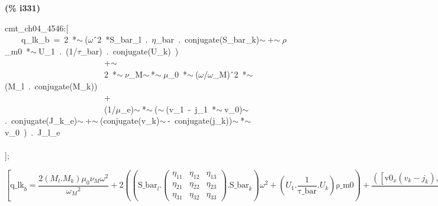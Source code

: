 \documentclass[fleqn]{article}
\begin{document}
\noindent
\begin{minipage}[t]{4.000000em}\color{red}\bfseries
(\% i331)	
\end{minipage}
\begin{minipage}[t]{\textwidth}\color{blue}
cmt\_ch04\_4546:[\\
\ \ \ \ q\_lk\_b\ =\ 2\ *\ensuremath{\sim\ }(\ensuremath{\omega}\^\ 2\ *S\_bar\_l\ .\ \ensuremath{\eta}\_bar\ .\ conjugate(S\_bar\_k)\ensuremath{\sim\ }+\ensuremath{\sim\ }\ensuremath{\rho}\_m0\ *\ensuremath{\sim\ }U\_1\ .\ (1/\ensuremath{\tau}\_bar)\ .\ conjugate(U\_k)\ )\\
\ \ \ \ \ \ \ \ \ \ \ \ \ \ \ \ \ \ \ \ \ \ \ \ +\ensuremath{\sim\ }\\
\ \ \ \ \ \ \ \ \ \ \ \ \ \ \ \ \ \ \ \ \ \ \ \ 2\ *\ensuremath{\sim\ }\ensuremath{\nu}\_M\ensuremath{\sim\ }*\ensuremath{\sim\ }\ensuremath{\mu}\_0\ *\ensuremath{\sim\ }(\ensuremath{\omega}/\ensuremath{\omega}\_M)\^\ 2\ *\ensuremath{\sim\ }(M\_l\ .\ conjugate(M\_k))\\
\ \ \ \ \ \ \ \ \ \ \ \ \ \ \ \ \ \ \ \ \ \ \ \ +\\
\ \ \ \ \ \ \ \ \ \ \ \ \ \ \ \ \ \ \ \ \ \ \ \ (1/\ensuremath{\mu}\_e)\ensuremath{\sim\ }*\ensuremath{\sim\ }(\ensuremath{\sim\ }(v\_1\ -\ j\_1\ *\ensuremath{\sim\ }v\_0)\ensuremath{\sim\ }.\ conjugate(J\_k\_e)\ensuremath{\sim\ }+\ensuremath{\sim\ }(conjugate(v\_k)\ensuremath{\sim\ }-\ conjugate(j\_k))\ensuremath{\sim\ }*\ensuremath{\sim\ }v\_0\ )\ .\ J\_l\_e\\
\ \ \ \ \\
];
\end{minipage}
\[\displaystyle \tag{\% o331} 
\operatorname{[}{{\ensuremath{\mathrm{q\_ lk}}}_b}=\frac{2 \left( {M_l}\ensuremath{\mathrm{ . }}{M_k}\right)  {{\mu }_0} {{\nu }_M} {{\omega }^{2}}}{{{{{\omega }_M}}^{2}}}+2 \left( \left( {{\ensuremath{\mathrm{S\_ bar}}}_l}\ensuremath{\mathrm{ . }}\begin{pmatrix}{{\eta }_{\ensuremath{\mathrm{11}}}} & {{\eta }_{\ensuremath{\mathrm{12}}}} & {{\eta }_{\ensuremath{\mathrm{13}}}}\\
{{\eta }_{\ensuremath{\mathrm{21}}}} & {{\eta }_{\ensuremath{\mathrm{22}}}} & {{\eta }_{\ensuremath{\mathrm{23}}}}\\
{{\eta }_{\ensuremath{\mathrm{31}}}} & {{\eta }_{\ensuremath{\mathrm{32}}}} & {{\eta }_{\ensuremath{\mathrm{33}}}}\end{pmatrix}\ensuremath{\mathrm{ . }}{{\ensuremath{\mathrm{S\_ bar}}}_k}\right)  {{\omega }^{2}}+\left( {U_1}\ensuremath{\mathrm{ . }}\frac{1}{\ensuremath{\mathrm{\tau \_ bar}}}\ensuremath{\mathrm{ . }}{U_k}\right)  \ensuremath{\mathrm{\rho \_ m0}}\right) +
\frac{\left( \left[ {{\ensuremath{\mathrm{v0}}}_x} \left( {v_k}-{j_k}\right) \operatorname{,}{{\ensuremath{\mathrm{v0}}}_y} \left( {v_k}-{j_k}\right) \operatorname{,}{{\ensuremath{\mathrm{v0}}}_z} \left( {v_k}-{j_k}\right) \right] +\left[ {v_1}-{j_1} {{\ensuremath{\mathrm{v0}}}_x}\operatorname{,}{v_1}-{j_1} {{\ensuremath{\mathrm{v0}}}_y}\operatorname{,}{v_1}-{j_1} {{\ensuremath{\mathrm{v0}}}_z}\right] \ensuremath{\mathrm{ . }}{{\ensuremath{\mathrm{J\_ k}}}_e}\right) \ensuremath{\mathrm{ . }}{{\ensuremath{\mathrm{J\_ l}}}_e}}{{{\mu }_e}}\operatorname{]}\mbox{}
\]
\end{document}
